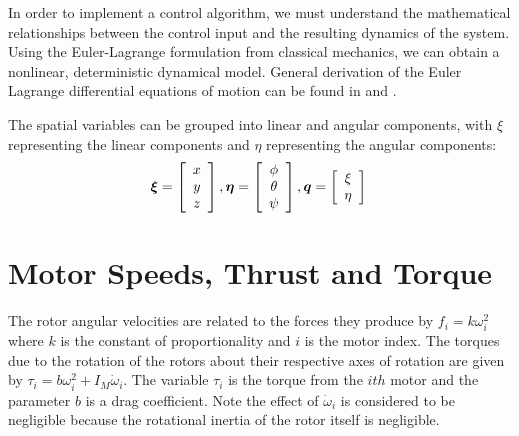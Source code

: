 In order to implement a control algorithm, we must understand the mathematical relationships between the control input and the resulting dynamics of the system. Using the Euler-Lagrange formulation from classical mechanics, we can obtain a nonlinear, deterministic dynamical model. General derivation of the Euler Lagrange differential equations of motion can be found in \cite{marion1995classical} and  \cite{cornelius1970variational}.



The spatial variables can be grouped into linear and angular components, with $\xi$ representing the linear components and $\eta$ representing the angular components:\\
\begin{equation}
\boldsymbol \xi = \left[ \begin{array}{c}
x\\y\\z\\
\end{array} \right] , \boldsymbol \eta =  \left[ \begin{array}{c}
\phi\\\theta\\\psi\\
\end{array} \right] , \boldsymbol q = \left[ \begin{array}{c}
\xi\\\eta\\
\end{array} \right]\\
\end{equation}

\section{Motor Speeds, Thrust and Torque}

\indent The rotor angular velocities are related to the forces they produce by $f_i = k \omega^2_i$ where $k$ is the constant of proportionality and $i$  is the motor index. The torques due to the rotation of the rotors about their respective axes of rotation are given by $\tau_{i} = b \omega^2_i + I_M \dot{\omega}_i$. The variable $ \tau_{i}$ is the torque from the $ith$ motor and the parameter $b$ is a drag coefficient. Note the effect of $\dot{\omega}_i$ is considered to be negligible because the rotational inertia of the rotor itself is negligible.

